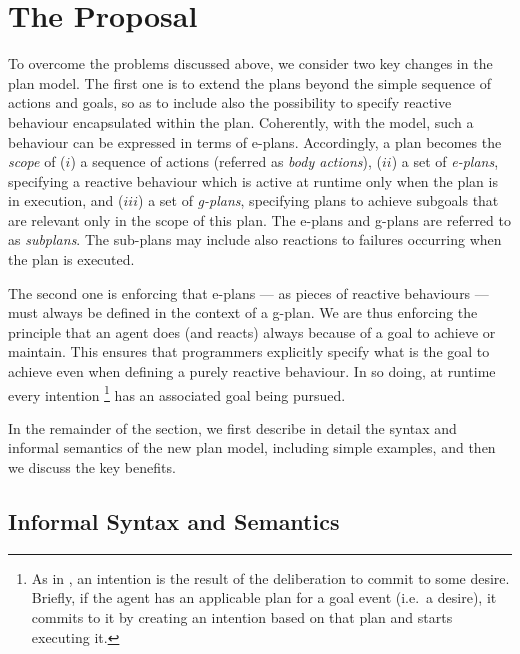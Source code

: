 \section{The {\aser} Proposal}
\label{sec:proposal}

To overcome the problems discussed above, we consider two key changes
in the plan model.
%
The first one is to extend the plans beyond the simple sequence of
actions and goals, so as to include also the possibility to specify
reactive behaviour encapsulated within the plan.
%
Coherently, with the {\asl} model, such a behaviour can be expressed
in terms of e-plans.
%
Accordingly, a plan becomes the \emph{scope} of ($i$) a sequence of
actions (referred as \emph{body actions}), ($ii$) a set of
\emph{e-plans}, specifying a reactive behaviour which is active at
runtime only when the plan is in execution, and ($iii$) a set of
\emph{g-plans}, specifying plans to achieve subgoals that are relevant
only in the scope of this plan. The e-plans and g-plans are referred
to as \emph{subplans}.
%
The sub-plans may include also reactions to failures occurring when
the plan is executed.

%
%
%
The second one is enforcing that e-plans --- as pieces of reactive
behaviours --- must always be defined in the context of a g-plan. We
are thus enforcing the principle that an agent does (and reacts)
always because of a goal to achieve or maintain.
%
This ensures that programmers explicitly specify what is the goal to
achieve even when defining a purely reactive behaviour.
%
In so doing, at runtime every intention \footnote{As in \asl, an
  intention is the result of the deliberation to commit to some
  desire. Briefly, if the agent has an applicable plan for a goal
  event (i.e.\ a desire), it commits to it by creating an intention
  based on that plan and starts executing it.} has an
associated goal being pursued.

In the remainder of the section, we first describe in detail the
syntax and informal semantics of the new plan model, including simple
examples, and then we discuss the key benefits.

\subsection{Informal Syntax and Semantics}

